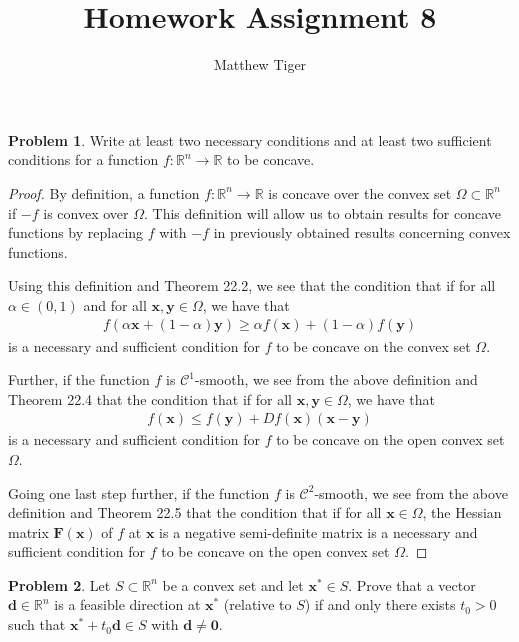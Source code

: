 \documentclass[12pt]{article}
\title{Homework Assignment 8}
\author{Matthew Tiger}
\theoremstyle{definition}
\newtheorem{problem}{Problem}
\newcommand{\vc}[1]{\boldsymbol{#1}}
\begin{document}
\maketitle


\begin{problem}
  Write at least two necessary conditions and at least two sufficient conditions for
  a function $f: \mathbb{R}^n \to \mathbb{R}$ to be concave.
\end{problem}

\begin{proof}
  By definition, a function $f: \mathbb{R}^n \to \mathbb{R}$ is concave over the convex
  set $\Omega \subset \mathbb{R}^n$ if $-f$ is convex over $\Omega$. This
  definition will allow us to obtain results for concave functions by replacing
  $f$ with $-f$ in previously obtained results concerning convex functions.

  Using this definition and Theorem 22.2, we see that the condition that if for all
  $\alpha \in (0, 1)$ and for all $\vc{x}, \vc{y} \in \Omega$, we have that
  \begin{align*}
    f(\alpha\vc{x} + (1-\alpha)\vc{y}) \geq \alpha f(\vc{x}) + (1-\alpha)f(\vc{y})
  \end{align*}
  is a necessary and sufficient condition for $f$ to be concave on the convex set $\Omega$.

  Further, if the function $f$ is $\mathcal{C}^1$-smooth, we see from the above definition and Theorem 22.4 that the condition that
  if for all $\vc{x}, \vc{y} \in \Omega$, we have that
  \begin{align*}
    f(\vc{x}) \leq f(\vc{y}) + D f(\vc{x}) (\vc{x} - \vc{y})
  \end{align*}
  is a necessary and sufficient condition for $f$ to be concave on the open convex set $\Omega$.

  Going one last step further, if the function $f$ is $\mathcal{C}^2$-smooth, we see from the above definition and Theorem
  22.5 that the condition that if for all $\vc{x}\in\Omega$, the Hessian matrix $\vc{F}(\vc{x})$ of $f$ at $\vc{x}$ is a negative semi-definite matrix
  is a necessary and sufficient condition for $f$ to be concave on the open convex set $\Omega$.
\end{proof}
\newpage


\begin{problem}
  Let $S \subset \mathbb{R}^n$ be a convex set and let $\vc{x}^* \in S$. Prove that a vector
  $\vc{d} \in \mathbb{R}^n$ is a feasible direction at $\vc{x}^*$ (relative to $S$) if and only
  there exists $t_0 > 0$ such that $\vc{x}^* + t_0 \vc{d} \in S$ with $\vc{d} \neq \vc{0}$.
\end{problem}
\end{document}
